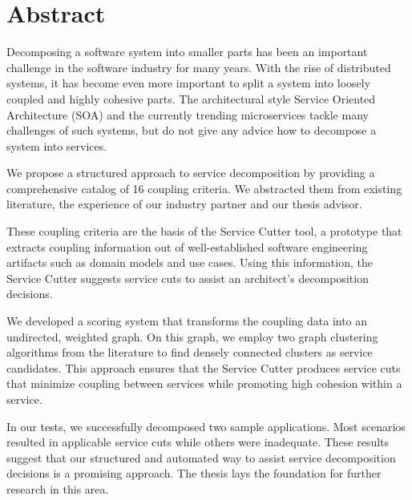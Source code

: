 \chapter{Abstract}

Decomposing a software system into smaller parts has been an important challenge in the software industry for many years. With the rise of distributed systems, it has become even more important to split a system into loosely coupled and highly cohesive parts. The architectural style Service Oriented Architecture (SOA) and the currently trending microservices tackle many challenges of such systems, but do not give any advice how to decompose a system into services.

We propose a structured approach to service decomposition by providing a comprehensive catalog of 16 coupling criteria. We abstracted them from existing literature, the experience of our industry partner and our thesis advisor. 

These coupling criteria are the basis of the Service Cutter tool, a prototype that extracts coupling information out of well-established software engineering artifacts such as domain models and use cases. Using this information, the Service Cutter suggests service cuts to assist an architect’s decomposition decisions. 

We developed a scoring system that transforms the coupling data into an undirected, weighted graph. On this graph, we employ two graph clustering algorithms from the literature to find densely connected clusters as service candidates. This approach ensures that the Service Cutter produces service cuts that minimize coupling between services while promoting high cohesion within a service.

In our tests, we successfully decomposed two sample applications. Most scenarios resulted in applicable service cuts while others were inadequate. These results suggest that our structured and automated way to assist service decomposition decisions is a promising approach. The thesis lays the foundation for further research in this area.
